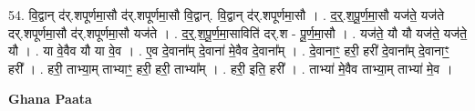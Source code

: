 \documentclass[17pt]{extarticle}
\begin{document}
54. वि॒द्वान् द॑र्.शपूर्णमा॒सौ द॑र्.शपूर्णमा॒सौ वि॒द्वान्. वि॒द्वान् द॑र्.शपूर्णमा॒सौ । . द॒र्॒.श॒पू॒र्ण॒मा॒सौ यज॑ते॒ यज॑ते दर्.शपूर्णमा॒सौ द॑र्.शपूर्णमा॒सौ यज॑ते । . द॒र्॒.श॒पू॒र्ण॒मा॒साविति॑ दर्.श - पू॒र्ण॒मा॒सौ । . यज॑ते॒ यौ यौ यज॑ते॒ यज॑ते॒ यौ । . या वे॒वैव यौ या वे॒व । . ए॒व दे॒वाना᳚म् दे॒वाना॑ मे॒वैव दे॒वाना᳚म् । . दे॒वानाꣳ॒॒ हरी॒ हरी॑ दे॒वाना᳚म् दे॒वानाꣳ॒॒ हरी᳚ । . हरी॒ ताभ्या॒म् ताभ्याꣳ॒॒ हरी॒ हरी॒ ताभ्या᳚म् । . हरी॒ इति॒ हरी᳚ । . ताभ्या॑ मे॒वैव ताभ्या॒म् ताभ्या॑ मे॒व । \newline

\textbf{Ghana Paata } \newline
\end{document}
